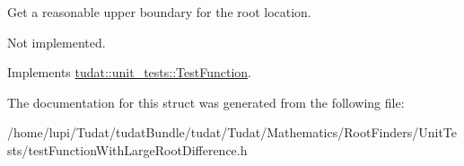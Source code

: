 Get a reasonable upper boundary for the root location. 

Not implemented. 

Implements \hyperlink{structtudat_1_1unit__tests_1_1TestFunction_ac7eb011b8e647185cdaf34dbddc06c27}{tudat\+::unit\+\_\+tests\+::\+Test\+Function}.



The documentation for this struct was generated from the following file\+:\begin{DoxyCompactItemize}
\item 
/home/lupi/\+Tudat/tudat\+Bundle/tudat/\+Tudat/\+Mathematics/\+Root\+Finders/\+Unit\+Tests/test\+Function\+With\+Large\+Root\+Difference.\+h\end{DoxyCompactItemize}
